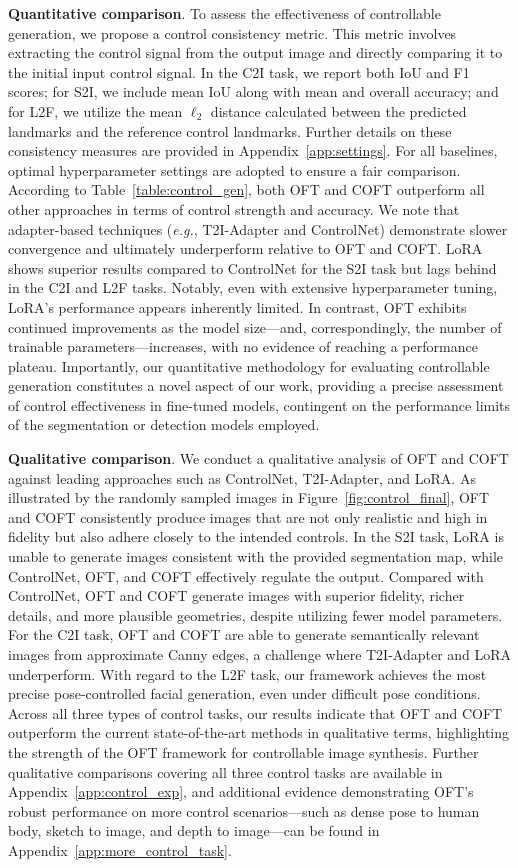 \textbf{Quantitative comparison}. To assess the effectiveness of controllable generation, we propose a control consistency metric. This metric involves extracting the control signal from the output image and directly comparing it to the initial input control signal. In the C2I task, we report both IoU and F1 scores; for S2I, we include mean IoU along with mean and overall accuracy; and for L2F, we utilize the mean $\ell_2$ distance calculated between the predicted landmarks and the reference control landmarks. Further details on these consistency measures are provided in Appendix~\ref{app:settings}. For all baselines, optimal hyperparameter settings are adopted to ensure a fair comparison. According to Table~\ref{table:control_gen}, both OFT and COFT outperform all other approaches in terms of control strength and accuracy. We note that adapter-based techniques (\emph{e.g.}, T2I-Adapter and ControlNet) demonstrate slower convergence and ultimately underperform relative to OFT and COFT. LoRA shows superior results compared to ControlNet for the S2I task but lags behind in the C2I and L2F tasks. Notably, even with extensive hyperparameter tuning, LoRA’s performance appears inherently limited. In contrast, OFT exhibits continued improvements as the model size—and, correspondingly, the number of trainable parameters—increases, with no evidence of reaching a performance plateau. Importantly, our quantitative methodology for evaluating controllable generation constitutes a novel aspect of our work, providing a precise assessment of control effectiveness in fine-tuned models, contingent on the performance limits of the segmentation or detection models employed.

\textbf{Qualitative comparison}. We conduct a qualitative analysis of OFT and COFT against leading approaches such as ControlNet, T2I-Adapter, and LoRA. As illustrated by the randomly sampled images in Figure~\ref{fig:control_final}, OFT and COFT consistently produce images that are not only realistic and high in fidelity but also adhere closely to the intended controls. In the S2I task, LoRA is unable to generate images consistent with the provided segmentation map, while ControlNet, OFT, and COFT effectively regulate the output. Compared with ControlNet, OFT and COFT generate images with superior fidelity, richer details, and more plausible geometries, despite utilizing fewer model parameters. For the C2I task, OFT and COFT are able to generate semantically relevant images from approximate Canny edges, a challenge where T2I-Adapter and LoRA underperform. With regard to the L2F task, our framework achieves the most precise pose-controlled facial generation, even under difficult pose conditions. Across all three types of control tasks, our results indicate that OFT and COFT outperform the current state-of-the-art methods in qualitative terms, highlighting the strength of the OFT framework for controllable image synthesis. Further qualitative comparisons covering all three control tasks are available in Appendix~\ref{app:control_exp}, and additional evidence demonstrating OFT’s robust performance on more control scenarios—such as dense pose to human body, sketch to image, and depth to image—can be found in Appendix~\ref{app:more_control_task}.

